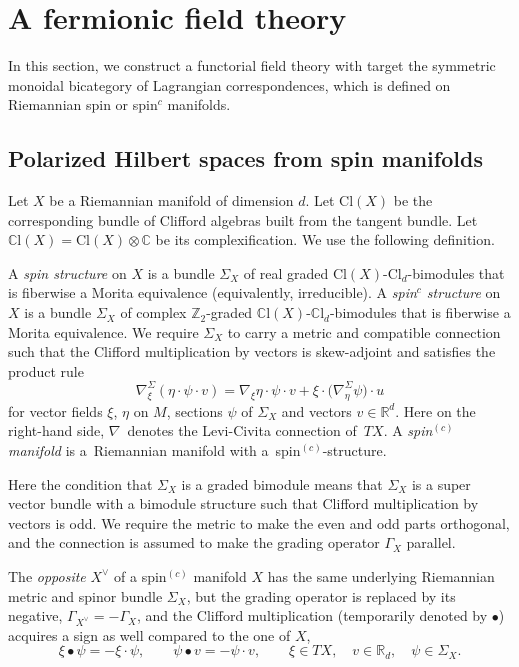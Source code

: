 \documentclass[pdftex]{sigma}
\numberwithin{equation}{section}
\newcommand{\R}{\mathbb{R}}
\newcommand{\Z}{\mathbb{Z}}
\newcommand{\C}{\mathbb{C}}
\newcommand{\Cl}{\mathrm{Cl}}
\newcommand{\CCl}{\mathbb{C}\mathrm{l}}
\begin{document}
\section{A fermionic field theory}
\label{SectionFieldTheorySUP}

In this section, we construct a functorial field theory with target the symmetric monoidal bicategory of Lagrangian correspondences, which is defined on Riemannian spin or spin$^c$ manifolds.


\subsection{Polarized Hilbert spaces from spin manifolds}
Let $X$ be a Riemannian manifold of dimension $d$.
Let $\Cl(X)$ be the corresponding bundle of Clifford algebras built from the tangent bundle.
Let $\CCl(X) = \Cl(X) \otimes \C$ be its complexification.
We use the following definition.

\begin{Definition} \label{DefinitionSpinStructure}
 A \emph{spin structure} on $X$ is a bundle $\Sigma_X$ of real graded $\Cl(X)$-$\Cl_d$-bimodules that is fiberwise a Morita equivalence (equivalently, irreducible).
 A \emph{spin$^c$ structure} on $X$ is a bundle $\Sigma_X$ of complex $\Z_2$-graded $\CCl(X)$-$\CCl_d$-bimodules that is fiberwise a Morita equivalence.
 We require $\Sigma_X$ to carry a metric and compatible connection such that the Clifford multiplication by vectors is skew-adjoint and satisfies the product rule
 \begin{equation*}
 \nabla^\Sigma_\xi(\eta \cdot \psi \cdot v) = \nabla_\xi \eta \cdot \psi \cdot v + \xi \cdot \big(\nabla_\eta^\Sigma \psi\big) \cdot u
 \end{equation*}
 for vector fields $\xi$, $\eta$ on $M$, sections $\psi$ of $\Sigma_X$ and vectors $v \in \R^d$.
 Here on the right-hand side, $\nabla$~denotes the Levi-Civita connection of~$TX$.
 A \emph{spin$^{(c)}$ manifold} is a~Riemannian manifold with a~spin$^{(c)}$-structure.
\end{Definition}

Here the condition that $\Sigma_X$ is a graded bimodule means that $\Sigma_X$ is a super vector bundle with a bimodule structure such that Clifford multiplication by vectors is odd.
We require the metric to make the even and odd parts orthogonal, and the connection is assumed to make the grading operator $\Gamma_X$ parallel.

\begin{Definition}[opposite]
The \emph{opposite} $X^\vee$ of a spin$^{(c)}$ manifold $X$ has the same underlying Riemannian metric and spinor bundle $\Sigma_X$, but the grading operator is replaced by its negative, $\Gamma_{X^\vee} = - \Gamma_X$, and the Clifford multiplication (temporarily denoted by $\bullet$) acquires a sign as well compared to the one of $X$,
\begin{equation*}
 \xi \bullet \psi = - \xi \cdot \psi, \qquad \psi \bullet v = - \psi \cdot v, \qquad \xi \in TX, \quad v \in \R_d, \quad\psi \in \Sigma_X.
\end{equation*}
\end{Definition}
\end{document}
